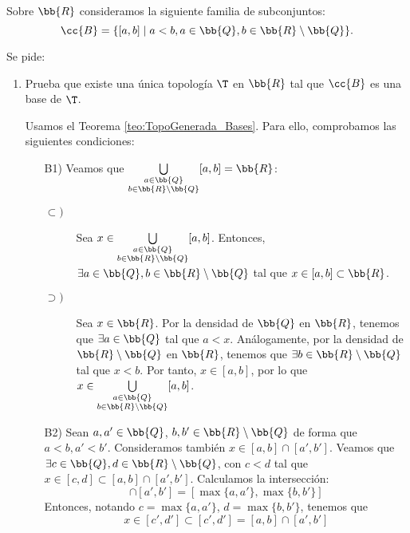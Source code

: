 \begin{ejercicio}
    Sobre $\bb{R}$ consideramos la siguiente familia de subconjuntos:
    \begin{equation*}
        \cc{B}=\{[a,b]\mid a<b,a\in \bb{Q}, b\in \bb{R}\setminus \bb{Q}\}.
    \end{equation*}

    Se pide:
    \begin{enumerate}[label=\alph*)]
        \item Prueba que existe una única topología $\T$ en $\bb{R}$ tal que $\cc{B}$ es una base de $\T$.

        Usamos el Teorema \ref{teo:TopoGenerada_Bases}. Para ello, comprobamos las siguientes condiciones:
        \begin{enumerate}
            \item[B1)] Veamos que $\bigcup\limits_{\substack{a\in \bb{Q}\\b\in \bb{R}\setminus\bb{Q}}} [a,b]=\bb{R}$:
            \begin{description}
                \item[$\subset)$]
                    Sea $x\in \bigcup\limits_{\substack{a\in \bb{Q}\\b\in \bb{R}\setminus\bb{Q}}} [a,b]$. Entonces, $\exists a\in \bb{Q}, b\in \bb{R}\setminus\bb{Q}$ tal que $x\in [a,b]\subset \bb{R}$.

                \item[$\supset)$]
                    Sea $x\in \bb{R}$. Por la densidad de $\bb{Q}$ en $\bb{R}$, tenemos que $\exists a\in \bb{Q}$ tal que $a<x$. Análogamente, por la densidad de $\bb{R}\setminus\bb{Q}$ en $\bb{R}$, tenemos que $\exists b\in \bb{R}\setminus\bb{Q}$ tal que $x<b$. Por tanto, $x\in [a,b]$, por lo que $x\in \bigcup\limits_{\substack{a\in \bb{Q}\\b\in \bb{R}\setminus\bb{Q}}} [a,b]$.
            \end{description}

            
            \item[B2)] Sean $a,a'\in \bb{Q}$, $b,b'\in \bb{R}\setminus\bb{Q}$ de forma que $a<b, a'<b'$. Consideramos también $x\in [a,b]\cap [a',b']$. Veamos que $\exists c\in \bb{Q}, d\in \bb{R}\setminus\bb{Q}$, con $c<d$ tal que $x\in [c,d]\subset [a,b]\cap [a',b']$. Calculamos la intersección:
            \begin{equation*}
                [a,b]\cap [a',b']=[\max\{a,a'\},\max\{b,b'\}]
            \end{equation*}
            Entonces, notando $c=\max\{a,a'\}$, $d=\max\{b,b'\}$, tenemos que
            \begin{equation*}
                x\in [c',d']\subset [c',d']=[a,b]\cap [a',b']
            \end{equation*}


\end{enumerate}
\end{enumerate}
\end{ejercicio}
